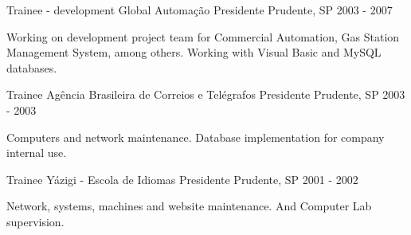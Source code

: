 \begin{cventries}
\cventry
{Trainee - development} %
{Global Automação} %
{Presidente Prudente, SP} %
{2003 - 2007} %
{
  \begin{cvitems} %
    \item {Working on development project team for Commercial Automation, Gas Station Management System, among others. Working with Visual Basic and MySQL databases.}
  \end{cvitems}
}


\cventry
{Trainee} %
{Agência Brasileira de Correios e Telégrafos} %
{Presidente Prudente, SP} %
{2003 - 2003} %
{
  \begin{cvitems} %
    \item {Computers and network maintenance. Database implementation for company internal use.}
  \end{cvitems}
}


\cventry
{Trainee} %
{Yázigi - Escola de Idiomas} %
{Presidente Prudente, SP} %
{2001 - 2002} %
{
  \begin{cvitems} %
    \item {Network, systems, machines and website maintenance. And Computer Lab supervision.}
  \end{cvitems}
}


\end{cventries}
